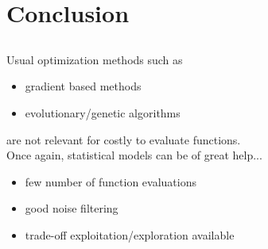 \documentclass{beamer}
\begin{document}
\section[Concl]{Conclusion}
\subsection{}

\begin{frame}[noframenumbering]{}
Usual optimization methods such as 
\begin{itemize}
	\item gradient based methods
	\item evolutionary/genetic algorithms
\end{itemize}
are not relevant for costly to evaluate functions.\\
\vspace{5mm}
Once again, statistical models can be of great help...
\begin{itemize}
	\item few number of function evaluations
	\item good noise filtering
	\item trade-off exploitation/exploration available
\end{itemize}
\end{frame}

\end{document}
